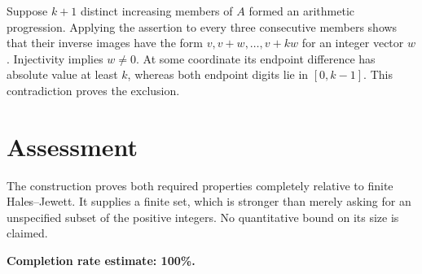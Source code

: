 \documentclass[11pt]{article}
\begin{document}
Suppose $k+1$ distinct increasing members of $A$ formed an arithmetic progression. Applying the assertion to every three consecutive members shows that their inverse images have the form $v,v+w,\ldots,v+kw$ for an integer vector $w$. Injectivity implies $w\ne0$. At some coordinate its endpoint difference has absolute value at least $k$, whereas both endpoint digits lie in $[0,k-1]$. This contradiction proves the exclusion.

\section*{Assessment}
The construction proves both required properties completely relative to finite Hales--Jewett. It supplies a finite set, which is stronger than merely asking for an unspecified subset of the positive integers. No quantitative bound on its size is claimed.

\textbf{Completion rate estimate: 100\%.}
\end{document}
